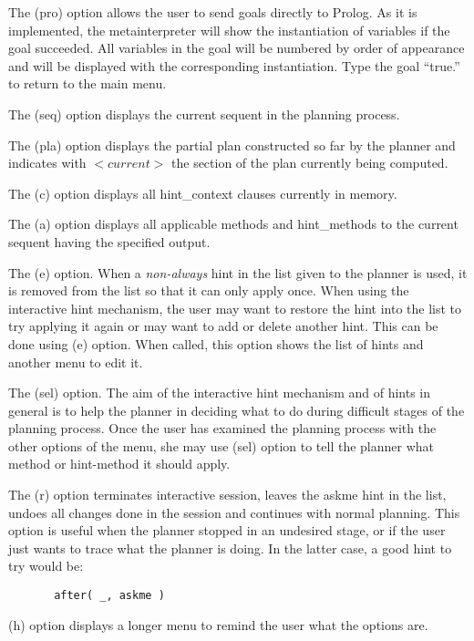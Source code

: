        The (pro) option allows the user to send goals directly to
Prolog. As it is implemented, the metainterpreter will show the
instantiation of variables if the goal succeeded. All variables in the
goal will be numbered by order of appearance and will be displayed with
the corresponding instantiation. Type the goal ``true.'' to return to
the main menu.

        The (seq) option displays the current sequent in the planning
process.

        
        The (pla) option displays the partial plan constructed so far
by the planner and indicates with $<current>$ the section of the plan
currently being computed.

        The (c) option displays all hint\_context clauses currently in
memory.


        The (a) option displays all applicable methods and
hint\_methods to the current sequent having the specified output.

        
        The (e) option. When a {\it non-always} hint in the list given
to the planner is used, it is removed from the list so that it can only
apply once. When using the interactive hint mechanism, the user may
want to restore the hint into the list to try applying it again or may
want to add or delete another hint. This can be done using (e) option.
When called, this option shows the list of hints and another menu to
edit it. 

        
        The (sel) option. The aim of the interactive hint mechanism and
of hints in general is to help the planner in deciding what to do
during difficult stages of the planning process. Once the user has
examined the planning process with the other options of the menu, she
may use (sel) option to tell the planner what method or hint-method it
should apply.


        The (r) option terminates interactive session, leaves the askme
hint in the list, undoes all changes done in the session and continues
with normal planning. This option is useful when the planner stopped in
an undesired stage, or if the user just wants to trace what the planner
is doing. In the latter case, a good hint to try would be:

\begin{verbatim}
       after( _, askme )
\end{verbatim}

        (h) option displays a longer menu to remind the user what the
options are.


